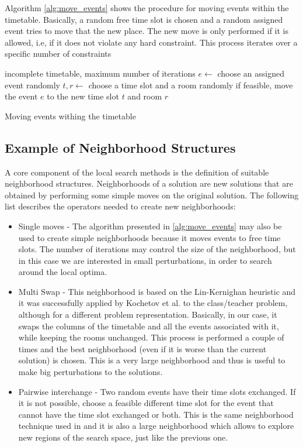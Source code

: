 Algorithm \ref{alg:move_events} shows the procedure for moving events within the timetable. Basically, a random free time slot is chosen and a random assigned event tries to move that the new place. The new move is only performed if it is allowed, i.e, if it does not violate any hard constraint. This process iterates over a specific number of constraints 

\begin{algorithm}[t]
\begin{algorithmic}
\Require incomplete timetable, maximum number of iterations  
	\State $e\gets $ choose an assigned event randomly
	\State $t,r\gets $ choose a time slot and a room randomly
	\State if feasible, move the event $e$ to the new time slot $t$ and room $r$
\EndFor
\caption{Moving events withing the timetable}\label{alg:move_events}
\end{algorithmic}
\end{algorithm}


\subsection{Example of Neighborhood Structures}

A core component of the local search methods is the definition of suitable neighborhood structures. Neighborhoods of a solution are new solutions that are obtained by performing some simple moves on the original solution. The following list describes the operators needed to create new neighborhoods:

\begin{itemize}

\item Single moves - The algorithm presented in \ref{alg:move_events} may also be used to create simple neighborhoods because it moves events to free time slots. The number of iterations may control the size of the neighborhood, but in this case we are interested in small perturbations, in order to search around the local optima. 

\item Multi Swap - This neighborhood is based on the Lin-Kernighan heuristic and it was successfully applied by Kochetov et al. \citep{kochetov2006local} to the class/teacher problem, although for a different problem representation. Basically, in our case, it swaps the columns of the timetable and all the events associated with it, while keeping the rooms unchanged. This process is performed a couple of times and the best neighborhood (even if it is worse than the current solution) is chosen. This is a very large neighborhood and thus is useful to make big perturbations to the solutions.

\item Pairwise interchange - Two random events have their time slots exchanged. If it is not possible, choose a feasible different time slot for the event that cannot have the time slot exchanged or both. This is the same neighborhood technique used in \citep{melicio2004two} and it is also a large neighborhood which allows to explore new regions of the search space, just like the previous one.
\end{itemize} 
